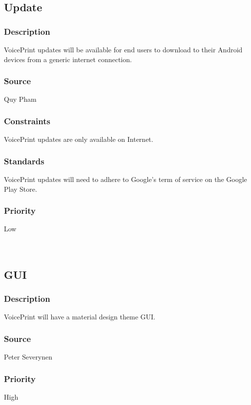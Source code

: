 \subsection{Update}
\subsubsection{Description}
VoicePrint updates will be available for end users to download to their Android devices from a generic internet connection.
\subsubsection{Source}
Quy Pham
\subsubsection{Constraints}
VoicePrint updates are only available on Internet.
\subsubsection{Standards}
VoicePrint updates will need to adhere to Google's term of service on the Google Play Store. \cite{play.google}
\subsubsection{Priority}
Low\\
\\
\\

\subsection{GUI}
\subsubsection{Description}
VoicePrint will have a material design theme GUI.
\subsubsection{Source}
Peter Severynen
\subsubsection{Priority}
High